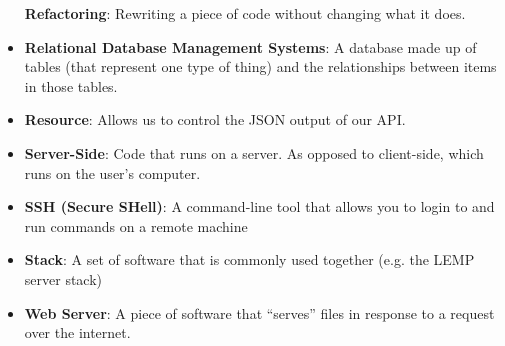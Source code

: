 \begin{itemize}[leftmargin=*]
        \textbf{Refactoring}:
        Rewriting a piece of code without changing what it does.
    \item
        \textbf{Relational Database Management Systems}:
        A database made up of tables (that represent one type of thing) and the relationships between items in those tables.
    \item
        \textbf{Resource}:
        Allows us to control the JSON output of our API.
    \item
        \textbf{Server-Side}:
        Code that runs on a server. As opposed to client-side, which runs on the user's computer.
    \item
        \textbf{SSH (Secure SHell)}:
        A command-line tool that allows you to login to and run commands on a remote machine
    \item
        \textbf{Stack}:
        A set of software that is commonly used together (e.g. the LEMP server stack)
    \item
        \textbf{Web Server}:
        A piece of software that ``serves'' files in response to a request over the internet.
\end{itemize}
